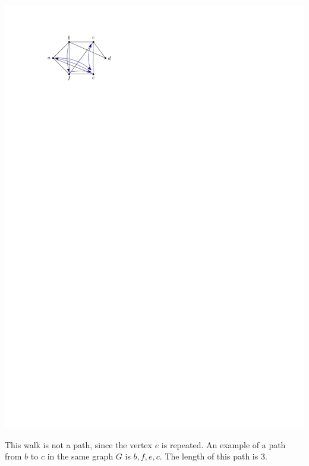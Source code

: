 \begin{Example}
\begin{center}
\includegraphics{Walk1.pdf}
\end{center}
This walk is not a path, since the vertex $e$ is repeated. An example of a path from $b$ to $c$ in the same graph $G$ is $b, f, e, c$. The length of this path is $3$.


\end{Example}
